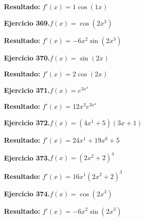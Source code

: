 \documentclass[10pt,a4paper]{article}
\begin{document}
\begin{solbox}
\textbf{Resultado:} \(\displaystyle f'(x) = 1\cos(1x)\)
\end{solbox}

\begin{ejbox}
\textbf{Ejercicio 369.}\quad $f(x) = \cos(2x^{3})$
\end{ejbox}

\begin{solbox}
\textbf{Resultado:} \(\displaystyle f'(x) = -6x^{2}\sin(2x^{3})\)
\end{solbox}

\newpage
\begin{ejbox}
\textbf{Ejercicio 370.}\quad $f(x) = \sin(2x)$
\end{ejbox}

\begin{solbox}
\textbf{Resultado:} \(\displaystyle f'(x) = 2\cos(2x)\)
\end{solbox}

\begin{ejbox}
\textbf{Ejercicio 371.}\quad $f(x) = e^{3x^{4}}$
\end{ejbox}

\begin{solbox}
\textbf{Resultado:} \(\displaystyle f'(x) = 12x^{3}e^{3x^{4}}\)
\end{solbox}

\begin{ejbox}
\textbf{Ejercicio 372.}\quad $f(x) = (4x^{1} +5)(3x +1)$
\end{ejbox}

\begin{solbox}
\textbf{Resultado:} \(\displaystyle f'(x) = 24x^{1} +19x^{0} +5\)
\end{solbox}

\newpage
\begin{ejbox}
\textbf{Ejercicio 373.}\quad $f(x) = (2x^{2} +2)^{4}$
\end{ejbox}

\begin{solbox}
\textbf{Resultado:} \(\displaystyle f'(x) = 16x^{1}(2x^{2} +2)^{3}\)
\end{solbox}

\begin{ejbox}
\textbf{Ejercicio 374.}\quad $f(x) = \cos(2x^{3})$
\end{ejbox}

\begin{solbox}
\textbf{Resultado:} \(\displaystyle f'(x) = -6x^{2}\sin(2x^{3})\)
\end{solbox}
\end{document}
